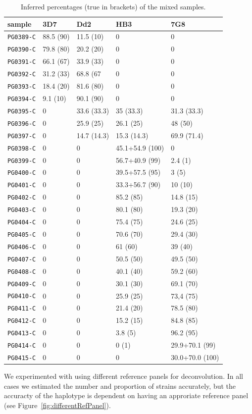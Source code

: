 \documentclass{bioinfo}
\begin{document}
\begin{methods}
\begin{table}[ht]\centering
\begin{tabular}[c]{@{}l|llll@{}}\hline
sample    & 3D7 & Dd2 & HB3 & 7G8 \\ \hline
{\tt	PG0389-C}	&	88.5	(90)	&	11.5	(10)	&		0	&		0	\tabularnewline
{\tt	PG0390-C}	&	79.8	(80)	&	20.2	(20)	&		0	&		0	\tabularnewline
{\tt	PG0391-C}	&	66.1	(67)	&	33.9	(33)	&		0	&		0	\tabularnewline
{\tt	PG0392-C}	&	31.2	(33)	&	68.8	(67	&		0	&		0	\tabularnewline
{\tt	PG0393-C}	&	18.4	(20)	&	81.6	(80)	&		0	&		0	\tabularnewline
{\tt	PG0394-C}	&	9.1	(10)	&	90.1	(90)	&		0	&		0	\tabularnewline
{\tt	PG0395-C}	&		0	&	33.6	(33.3)	&	35	(33.3)	&	31.3	(33.3)	\tabularnewline
{\tt	PG0396-C}	&		0	&	25.9	(25)	&	26.1	(25)	&	48	(50)	\tabularnewline
{\tt	PG0397-C}	&		0	&	14.7	(14.3)	&	15.3	(14.3)	&	69.9	(71.4)	\tabularnewline
{\tt	PG0398-C}	&		0	&		0	&	45.1+54.9	(100)	&		0	\tabularnewline
{\tt	PG0399-C}	&		0	&		0	&	56.7+40.9	(99)	&	2.4	(1)	\tabularnewline
{\tt	PG0400-C}	&		0	&		0	&	39.5+57.5	(95)	&	3	(5)	\tabularnewline
{\tt	PG0401-C}	&		0	&		0	&	33.3+56.7	(90)	&	10	(10)	\tabularnewline
{\tt	PG0402-C}	&		0	&		0	&	85.2	(85)	&	14.8	(15)	\tabularnewline
{\tt	PG0403-C}	&		0	&		0	&	80.1	(80)	&	19.3	(20)	\tabularnewline
{\tt	PG0404-C}	&		0	&		0	&	75.4	(75)	&	24.6	(25)	\tabularnewline
{\tt	PG0405-C}	&		0	&		0	&	70.6	(70)	&	29.4	(30)	\tabularnewline
{\tt	PG0406-C}	&		0	&		0	&	61	(60)	&	39	(40)	\tabularnewline
{\tt	PG0407-C}	&		0	&		0	&	50.5	(50)	&	49.5	(50)	\tabularnewline
{\tt	PG0408-C}	&		0	&		0	&	40.1	(40)	&	59.2	(60)	\tabularnewline
{\tt	PG0409-C}	&		0	&		0	&	30.1	(30)	&	69.1	(70)	\tabularnewline
{\tt	PG0410-C}	&		0	&		0	&	25.9	(25)	&	73,4	(75)	\tabularnewline
{\tt	PG0411-C}	&		0	&		0	&	21.4	(20)	&	78.5	(80)	\tabularnewline
{\tt	PG0412-C}	&		0	&		0	&	15.2	(15)	&	84.8	(85)	\tabularnewline
{\tt	PG0413-C}	&		0	&		0	&	3.8	(5)	&	96.2	(95)	\tabularnewline
{\tt	PG0414-C}	&		0	&		0	&	0	(1)	&	29.9+70.1	(99)	\tabularnewline
{\tt	PG0415-C}	&		0	&		0	&		0	&	30.0+70.0	(100)	\tabularnewline
\hline
\end{tabular}
\caption{Inferred percentages (true in brackets) of the mixed samples.}
\label{tab:jason}
\end{table}

We experimented with using different reference panels for deconvolution. In all cases we estimated the number and proportion of strains accurately, but the accuracty of the haplotype is dependent on having an approriate reference panel (see Figure~\ref{fig:differentRefPanel}).



\end{methods}
\end{document}
